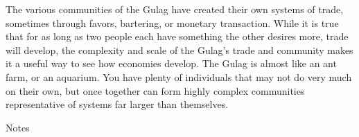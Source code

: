 \documentclass[12pt]{article}
\begin{document}
\begin{flushleft}
The various communities of the Gulag have created their own systems of trade, sometimes through favors, bartering, or monetary transaction. 
While it is true that for as long as two people each have something the other desires more, trade will develop, the complexity and scale of the Gulag's trade and community makes it a useful way to see how economies develop.
The Gulag is almost like an ant farm, or an aquarium. You have plenty of individuals that may not do very much on their own, but once together can form highly complex communities representative of systems far larger than themselves.



\begin{center}
Notes
\end{center}


\setlength{\parindent}{0.5in}

\end{flushleft}
\end{document}
